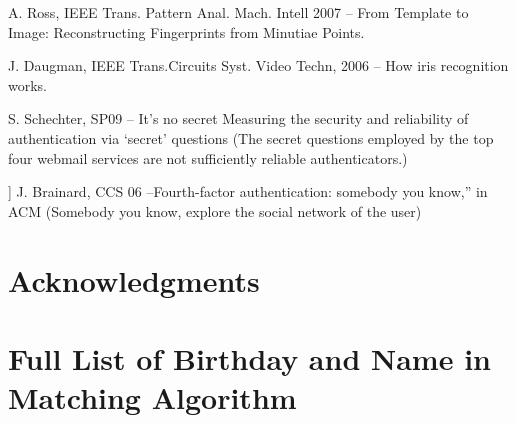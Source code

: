 \documentclass{sig-alternate}
\begin{document}
A. Ross, IEEE Trans. Pattern Anal. Mach. Intell 2007 -- From Template to Image: Reconstructing Fingerprints from Minutiae Points.

J. Daugman, IEEE Trans.Circuits Syst. Video Techn, 2006 -- How iris recognition works.

S. Schechter, SP09 -- It’s no secret Measuring the security and reliability of authentication via ‘secret’ questions (The secret questions employed by the top four webmail services are not sufficiently reliable authenticators.)

] J. Brainard, CCS 06 --Fourth-factor authentication: somebody you know,” in ACM (Somebody you know, explore the social network of the user)
\section{Acknowledgments}


%
%
\appendix
\section{Full List of Birthday and Name in Matching Algorithm}
\end{document}
